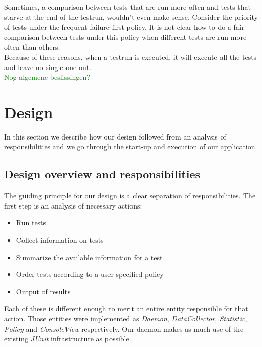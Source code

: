 \documentclass[i2]{oss}
\newcommand{\class}[1]{\emph{#1}}
\newcommand{\junit}{\emph{JUnit }}
\newcommand{\comment}[1]{{\huge \textcolor{green}{#1}}\\}
\begin{document}
Sometimes, a comparison between tests that are run more often and tests that starve at the end of the testrun, wouldn't even make sense.
Consider the priority of tests under the frequent failure first policy.
It is not clear how to do a fair comparison between tests under this policy when different tests are run more often than others.\\

Because of these reasons, when a testrun is executed, it will execute all the tests and leave no single one out.\\

\comment{Nog algemene beslissingen?}

\section{Design}
\label{ssec:design}

In this section we describe how our design followed from an analysis
of responsibilities and we go through the start-up and execution of 
our application.\\

\subsection{Design overview and responsibilities}
\label{subssec: Design overview}

The guiding principle for our design is a clear separation of 
responsibilities. The first step is an analysis of necessary actions:\\

\begin{itemize}
	\item Run tests
    \item Collect information on tests
    \item Summarize the available information for a test
    \item Order tests according to a user-specified policy
    \item Output of results
\end{itemize}

Each of these is different enough to merit an entire entity responsible 
for that action. Those entities were implemented as \class{Daemon},
\class{DataCollector}, \class{Statistic}, \class{Policy} and
\class{ConsoleView} respectively. Our daemon makes as much use of the 
existing \junit infrastructure as possible. \\
\end{document}
